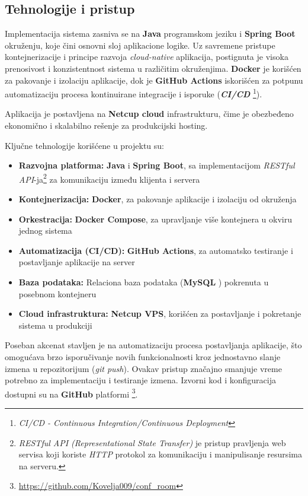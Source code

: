 \documentclass[12pt]{article}
\begin{document}
    \subsection{Tehnologije i pristup}

    Implementacija sistema zasniva se na \textbf{Java} \cite{java_language} programskom jeziku 
    i \textbf{Spring Boot} \cite{spring_boot} 
    okruženju, koje čini osnovni sloj aplikacione logike. Uz savremene pristupe 
    kontejnerizacije i principe razvoja \textit{cloud-native} aplikacija, postignuta je 
    visoka prenosivost i konzistentnost sistema u različitim okruženjima. \textbf{Docker} \cite{docker} je 
    korišćen za pakovanje i izolaciju aplikacije, dok je \textbf{GitHub Actions} \cite{github} iskorišćen 
    za potpunu automatizaciju procesa kontinuirane integracije i isporuke (\textbf{\textit{CI/CD}} \footnote{\textit{CI/CD - Continuous Integration/Continuous Deployment}}).

    Aplikacija je postavljena na \textbf{Netcup cloud} \cite{netcup} infrastrukturu, čime je obezbeđeno ekonomično i 
    skalabilno rešenje za produkcijski hosting.

    Ključne tehnologije korišćene u projektu su:
    \begin{itemize}
    \item \textbf{Razvojna platforma:} \textbf{Java} i \textbf{Spring Boot}, sa implementacijom \textit{RESTful API}-ja\footnote{\textit{RESTful API (Representational State Transfer)} je pristup pravljenja web servisa koji koriste \textit{HTTP} protokol za komunikaciju i manipulisanje resursima na serveru.}
 za komunikaciju između klijenta i servera
    \item \textbf{Kontejnerizacija:} \textbf{Docker}, za pakovanje aplikacije i izolaciju od okruženja  
    \item \textbf{Orkestracija:} \textbf{Docker Compose}, za upravljanje više kontejnera u okviru jednog sistema  
    \item \textbf{Automatizacija (CI/CD):} \textbf{GitHub Actions}, za automatsko testiranje i postavljanje aplikacije na server  
    \item \textbf{Baza podataka:} Relaciona baza podataka (\textbf{MySQL} \cite{mysql}) pokrenuta u posebnom kontejneru  
    \item \textbf{Cloud infrastruktura:} \textbf{Netcup VPS}, korišćen za postavljanje i pokretanje sistema u produkciji
    \end{itemize}
    
    \newpage
    Poseban akcenat stavljen je na automatizaciju procesa postavljanja aplikacije, 
    što omogućava brzo isporučivanje novih funkcionalnosti kroz jednostavno slanje izmena u 
    repozitorijum (\textit{git push}). Ovakav pristup značajno smanjuje vreme potrebno za 
    implementaciju i testiranje izmena.
    Izvorni kod i konfiguracija dostupni su na \textbf{GitHub} platformi \footnote{\url{https://github.com/Kovelja009/conf_room}}.
\end{document}
